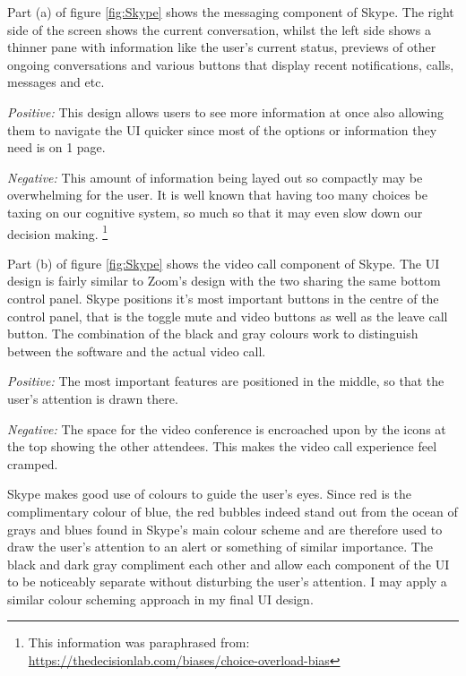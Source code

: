 Part (a) of figure \ref{fig:Skype} shows the messaging
component of Skype. The right side of the screen shows the
current conversation, whilst the left side shows a thinner
pane with information like the user's current status,
previews of other ongoing conversations and various buttons
that display recent notifications, calls, messages and etc.
\\ \vspace{0.2cm}

\textit{Positive:} This design allows users to see more
information at once also allowing them to navigate the UI
quicker since most of the options or information they need is
on 1 page. \\ \vspace{0.2cm}

\textit{Negative:} This amount of information being layed out
so compactly may be overwhelming for the user. It is well
known that having too many choices be taxing on our cognitive
system, so much so that it may even slow down our decision
making. \footnote{This information was paraphrased from:
\url{https://thedecisionlab.com/biases/choice-overload-bias}} \\ \vspace{0.2cm}

Part (b) of figure \ref{fig:Skype} shows the video call
component of Skype. The UI design is fairly similar to Zoom's
design with the two sharing the same bottom control panel.
Skype positions it's most important buttons in the centre of the
control panel, that is the toggle mute and video buttons as well
as the leave call button. The combination of the black and gray
colours work to distinguish between the software and the actual
video call.\\ \vspace{0.2cm}

\textit{Positive:} The most important features are positioned in
the middle, so that the user's attention is drawn there.
\\ \vspace{0.2cm}

\textit{Negative:} The space for the video conference is
encroached upon by the icons at the top showing the other
attendees. This makes the video call experience feel cramped.\\
\vspace{0.2cm}

Skype makes good use of colours to guide the user's eyes. Since red
is the complimentary colour of blue, the red
bubbles indeed stand out from the ocean of grays and blues found in
Skype's main colour scheme
and are therefore used to draw the user's attention to an alert or
something of similar importance. The black and dark gray
compliment each other and allow each component of the UI to
be noticeably separate without disturbing the user's attention.
I may apply a similar colour scheming approach in my final
UI design.

